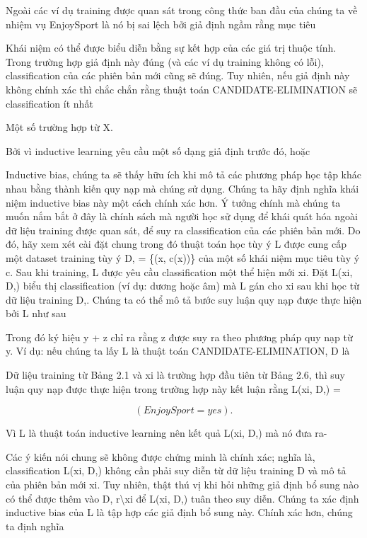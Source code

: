 Ngoài các ví dụ training được quan sát trong công thức ban đầu của chúng ta về nhiệm vụ EnjoySport là nó bị sai lệch bởi giả định ngầm rằng mục tiêu

Khái niệm có thể được biểu diễn bằng sự kết hợp của các giá trị thuộc tính. Trong trường hợp giả định này đúng (và các ví dụ training không có lỗi), classification của các phiên bản mới cũng sẽ đúng. Tuy nhiên, nếu giả định này không chính xác thì chắc chắn rằng thuật toán CANDIDATE-ELIMINATION sẽ classification ít nhất

Một số trường hợp từ X.

Bởi vì inductive learning yêu cầu một số dạng giả định trước đó, hoặc

Inductive bias, chúng ta sẽ thấy hữu ích khi mô tả các phương pháp học tập khác nhau bằng thành kiến ​​quy nạp mà chúng sử dụng. Chúng ta hãy định nghĩa khái niệm inductive bias này một cách chính xác hơn. Ý tưởng chính mà chúng ta muốn nắm bắt ở đây là chính sách mà người học sử dụng để khái quát hóa ngoài dữ liệu training được quan sát, để suy ra classification của các phiên bản mới. Do đó, hãy xem xét cài đặt chung trong đó thuật toán học tùy ý L được cung cấp một dataset training tùy ý D, = \{(x, c(x))\} của một số khái niệm mục tiêu tùy ý c. Sau khi training, L được yêu cầu classification một thể hiện mới xi. Đặt L(xi, D,) biểu thị classification (ví dụ: dương hoặc âm) mà L gán cho xi sau khi học từ dữ liệu training D,. Chúng ta có thể mô tả bước suy luận quy nạp được thực hiện bởi L như sau

Trong đó ký hiệu y + z chỉ ra rằng z được suy ra theo phương pháp quy nạp từ y. Ví dụ: nếu chúng ta lấy L là thuật toán CANDIDATE-ELIMINATION, D là

Dữ liệu training từ Bảng 2.1 và xi là trường hợp đầu tiên từ Bảng 2.6, thì suy luận quy nạp được thực hiện trong trường hợp này kết luận rằng L(xi, D,) =

\[(EnjoySport = yes).\]

Vì L là thuật toán inductive learning nên kết quả L(xi, D,) mà nó đưa ra-

Các ý kiến ​​nói chung sẽ không được chứng minh là chính xác; nghĩa là, classification L(xi, D,) không cần phải suy diễn từ dữ liệu training D và mô tả của phiên bản mới xi. Tuy nhiên, thật thú vị khi hỏi những giả định bổ sung nào có thể được thêm vào D, r\textbackslash{}xi để L(xi, D,) tuân theo suy diễn. Chúng ta xác định inductive bias của L là tập hợp các giả định bổ sung này. Chính xác hơn, chúng ta định nghĩa

